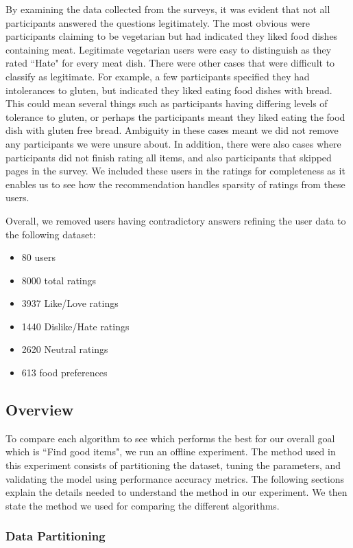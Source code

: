 By examining the data collected from the surveys, it was evident that not all participants answered the questions legitimately. The most obvious were participants claiming to be vegetarian but had indicated they liked food dishes containing meat. Legitimate vegetarian users were easy to distinguish as they rated ``Hate" for every meat dish. There were other cases that were difficult to classify as legitimate. For example, a few participants specified they had intolerances to gluten, but indicated they liked eating food dishes with bread. This could mean several things such as participants having differing levels of tolerance to gluten, or perhaps the participants meant they liked eating the food dish with gluten free bread. Ambiguity in these cases meant we did not remove any participants we were unsure about. In addition, there were also cases where participants did not finish rating all items, and also participants that skipped pages in the survey. We included these users in the ratings for completeness as it enables us to see how the recommendation handles sparsity of ratings from these users. 

Overall, we removed users having contradictory answers refining the user data to the following dataset:
\begin{itemize}
	\item{80 users}
	\item{8000 total ratings}
	\item{3937 Like/Love ratings}
	\item{1440 Dislike/Hate ratings}
    \item{2620 Neutral ratings}
	\item{613 food preferences}
\end{itemize}

\subsection{Overview}

To compare each algorithm to see which performs the best for our overall goal which is ``Find good items", we run an offline experiment. The method used in this experiment consists of partitioning the dataset, tuning the parameters, and validating the model using performance accuracy metrics. The following sections explain the details needed to understand the method in our experiment. We then state the method we used for comparing the different algorithms. 

\subsubsection{Data Partitioning}

